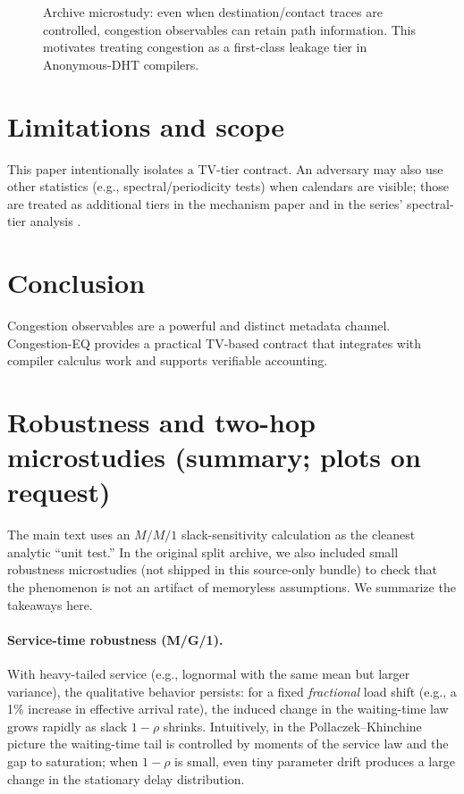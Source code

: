 \documentclass[11pt]{article}
\theoremstyle{definition}
\theoremstyle{remark}
\begin{document}
\begin{figure}[t]
\centering
{}
\caption{Archive microstudy: even when destination/contact traces are controlled, congestion observables can retain path information.
This motivates treating congestion as a first-class leakage tier in Anonymous-DHT compilers.}
\label{fig:dht}
\end{figure}

\section{Limitations and scope}
This paper intentionally isolates a TV-tier contract.
An adversary may also use other statistics (e.g., spectral/periodicity tests) when calendars are visible; those are treated as additional tiers in the mechanism paper and in the series' spectral-tier analysis \cite{series:spectral}.

\section{Conclusion}
Congestion observables are a powerful and distinct metadata channel.
Congestion-EQ provides a practical TV-based contract that integrates with compiler calculus work and supports verifiable accounting.


\section{Robustness and two-hop microstudies (summary; plots on request)}\label{sec:congeq_robust}
The main text uses an $M/M/1$ slack-sensitivity calculation as the cleanest analytic ``unit test.''
In the original split archive, we also included small robustness microstudies (not shipped in this source-only bundle) to check that the phenomenon is not an artifact of memoryless assumptions.
We summarize the takeaways here.

\paragraph{Service-time robustness (M/G/1).}
With heavy-tailed service (e.g., lognormal with the same mean but larger variance), the qualitative behavior persists:
for a fixed \emph{fractional} load shift (e.g., a 1\% increase in effective arrival rate), the induced change in the waiting-time law grows rapidly as slack $1-\rho$ shrinks.
Intuitively, in the Pollaczek--Khinchine picture the waiting-time tail is controlled by moments of the service law and the gap to saturation; when $1-\rho$ is small, even tiny parameter drift produces a large change in the stationary delay distribution.
\end{document}
